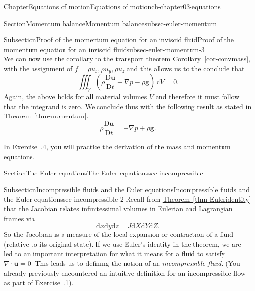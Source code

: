 \documentclass[oneside,10pt,]{book}
\newcommand{\xreffont}{\relax}
\numberwithin{equation}{section}
\newcommand{\de}{\mathrm{d}}
\newcommand{\DD}[2]{\frac{\mathrm{D}#1}{\mathrm{D}#2}}
\newcommand{\dxyz}{\de{x}\de{y}\de{z}}
\newcommand{\dXYZ}{\de{X}\de{Y}\de{Z}}
\newcommand{\bu}{\boldsymbol{u}}
\newcommand{\bg}{\boldsymbol{g}}
\begin{document}
\begin{chapterptx}{Chapter}{Equations of motion}{}{Equations of motion}{}{}{ch-chapter03-equations}
\begin{sectionptx}{Section}{Momentum balance}{}{Momentum balance}{}{}{subsec-euler-momentum}
\begin{subsectionptx}{Subsection}{Proof of the momentum equation for an inviscid fluid}{}{Proof of the momentum equation for an inviscid fluid}{}{}{subsec-euler-momentum-3}
\begin{equation*}
\end{equation*}
We can now use the corollary to the transport theorem \hyperref[cor-convmass]{Corollary~{\xreffont\ref{cor-convmass}}}, with the assignment of \(f = \rho u_x, \rho u_y, \rho u_z\) and this allows us to the conclude that%
\begin{equation*}
\iiint_{V} \left( \rho \DD{\bu}{t} + \nabla p - \rho \bg\right) \, \de{V} = 0.
\end{equation*}
Again, the above holds for all material volumes \(V\) and therefore it must follow that the integrand is zero. We conclude thus with the following result as stated in \hyperref[thm-momentum]{Theorem~{\xreffont\ref{thm-momentum}}}:%
\begin{equation*}
\rho \DD{\bu}{t} = - \nabla p + \rho \bg.
\end{equation*}
%
\par
In \hyperlink{ex-euler-check}{Exercise~{\xreffont 3.6.4}}, you will practice the derivation of the mass and momentum equations.%
\end{subsectionptx}
\end{sectionptx}
%
%
\typeout{************************************************}
\typeout{************************************************}
%
\begin{sectionptx}{Section}{The Euler equations}{}{The Euler equations}{}{}{sec-incompressible}
%
%
\typeout{************************************************}
\typeout{************************************************}
%
\begin{subsectionptx}{Subsection}{Incompressible fluids and the Euler equations}{}{Incompressible fluids and the Euler equations}{}{}{sec-incompressible-2}
Recall from \hyperref[thm-Euleridentity]{Theorem~{\xreffont\ref{thm-Euleridentity}}} that the Jacobian relates infinitessimal volumes in Eulerian and Lagrangian frames via%
\begin{equation}
\dxyz = J \dXYZ\text{.}\label{eq-dxyz-Jacobian}
\end{equation}
So the Jacobian is a measure of the local expansion or contraction of a fluid (relative to its original state). If we use Euler's identity in the theorem, we are led to an important interpretation for what it means for a fluid to satisfy \(\nabla \cdot \bu = 0\). This leads us to defining the notion of an \emph{incompressible fluid.} (You already previously encountered an intuitive definition for an incompressible flow as part of \hyperlink{ex-video-flow-visualisation}{Exercise~{\xreffont 2.3.1}}).%

\end{subsectionptx}
\end{sectionptx}
\end{chapterptx}
\end{document}
